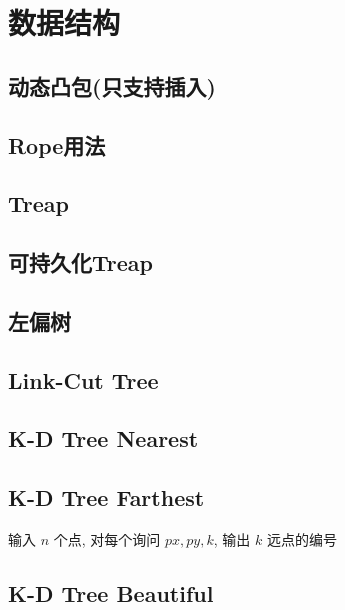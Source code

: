 \documentclass[landscape, twocolumn, 8pt, a4paper, twoside]{extarticle}
\begin{document}
\section{数据结构}
\subsection{动态凸包(只支持插入)}


\subsection{Rope用法}


\subsection{Treap}


\subsection{可持久化Treap}


\subsection{左偏树}


\subsection{Link-Cut Tree}


\subsection{K-D Tree Nearest}


\subsection{K-D Tree Farthest}
输入 $n$ 个点, 对每个询问 $px, py, k$, 输出 $k$ 远点的编号


\subsection{K-D Tree Beautiful}

\end{document}
